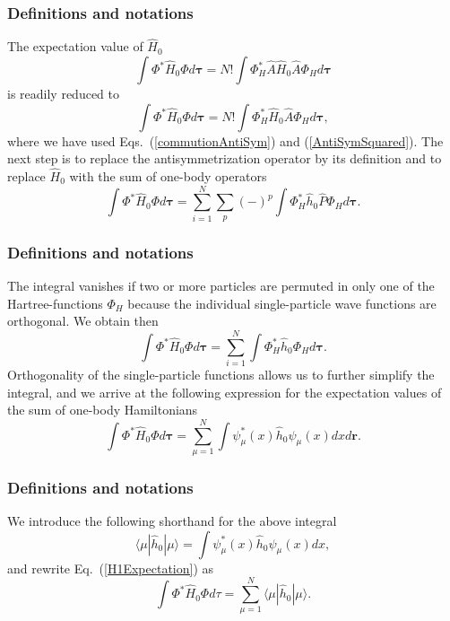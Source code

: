 \documentclass{beamer}
\begin{document}
\begin{frame}
\frametitle{Definitions and notations}

\begin{block}{}
The expectation value of $\hat{H}_0$ 
\[
  \int \Phi^*\hat{H}_0\Phi d\mathbf{\tau} 
  = N! \int \Phi_H^*\hat{A}\hat{H}_0\hat{A}\Phi_H d\mathbf{\tau}
\]
is readily reduced to
\[
  \int \Phi^*\hat{H}_0\Phi d\mathbf{\tau} 
  = N! \int \Phi_H^*\hat{H}_0\hat{A}\Phi_H d\mathbf{\tau},
\]
where we have used Eqs.~(\ref{commutionAntiSym}) and
(\ref{AntiSymSquared}). The next step is to replace the antisymmetrization
operator by its definition and to
replace $\hat{H}_0$ with the sum of one-body operators
\[
  \int \Phi^*\hat{H}_0\Phi  d\mathbf{\tau}
  = \sum_{i=1}^N \sum_{p} (-)^p\int 
  \Phi_H^*\hat{h}_0\hat{P}\Phi_H d\mathbf{\tau}.
\]
\end{block}
\end{frame}

\begin{frame}
\frametitle{Definitions and notations}

\begin{block}{}
The integral vanishes if two or more particles are permuted in only one
of the Hartree-functions $\Phi_H$ because the individual single-particle wave functions are
orthogonal. We obtain then
\[
  \int \Phi^*\hat{H}_0\Phi  d\mathbf{\tau}= \sum_{i=1}^N \int \Phi_H^*\hat{h}_0\Phi_H  d\mathbf{\tau}.
\]
Orthogonality of the single-particle functions allows us to further simplify the integral, and we
arrive at the following expression for the expectation values of the
sum of one-body Hamiltonians 
\begin{equation}
  \int \Phi^*\hat{H}_0\Phi  d\mathbf{\tau}
  = \sum_{\mu=1}^N \int \psi_{\mu}^*(x)\hat{h}_0\psi_{\mu}(x)dx
  d\mathbf{r}.
  \label{H1Expectation}
\end{equation}
\end{block}
\end{frame}

\begin{frame}
\frametitle{Definitions and notations}

\begin{block}{}
We introduce the following shorthand for the above integral
\[
\langle \mu | \hat{h}_0 | \mu \rangle = \int \psi_{\mu}^*(x)\hat{h}_0\psi_{\mu}(x)dx,
\]
and rewrite Eq.~(\ref{H1Expectation}) as
\begin{equation}
  \int \Phi^*\hat{H}_0\Phi  d\tau
  = \sum_{\mu=1}^N \langle \mu | \hat{h}_0 | \mu \rangle.
  \label{H1Expectation1}
\end{equation}
\end{block}
\end{frame}
\end{document}
